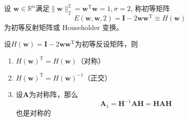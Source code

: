 \begin{definition}[初等反射矩阵]
    设 $\boldsymbol{w}\in\mathbb{R}^n$满足$\|\boldsymbol{w}\|_2^2=\boldsymbol{w}^{\mathrm{T}}\boldsymbol{w}=1,\sigma=2$, 称初等矩阵
    \[
        E(\boldsymbol{w},\boldsymbol{w},2)=\boldsymbol{I}-2\boldsymbol{w}\boldsymbol{w}^{\mathrm{T}}\equiv H(\boldsymbol{w})
    \]
    为初等反射矩阵或 Householder 变换。
\end{definition}
\begin{theorem}
    设$H(\boldsymbol{w}) = \boldsymbol{I}-2\boldsymbol{w}\boldsymbol{w}^{\mathrm{T}}$为初等反设矩阵，则
    \begin{enumerate}
        \item $H(\boldsymbol{w})^{\mathrm{T}} = H(\boldsymbol{w})$（对称）
        \item $H(\boldsymbol{w})^{\mathrm{T}} = H(\boldsymbol{w})^{-1}$（正交）
        \item 设$\boldsymbol{A}$为对称阵，那么
        \[
            \boldsymbol{A}_1 = \boldsymbol{H}^{-1}\boldsymbol{A}\boldsymbol{H} = \boldsymbol{HAH}
        \]也是对称的
    \end{enumerate}
\end{theorem}
